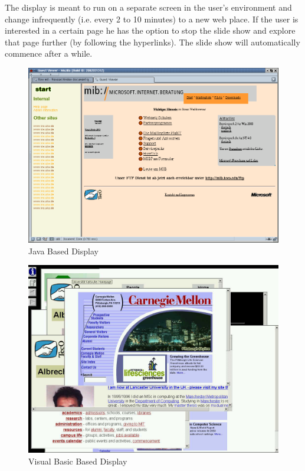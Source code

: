 \documentclass[a4paper,twoside]{danarticle}
\theoremstyle{remark}
\begin{document}
      The display is meant to run on a separate screen in the user's environment
      and change infrequently (i.e. every 2 to 10 minutes) to a new web place.
      If the user is interested in a certain page he has the option to stop the
      slide show and explore that page further (by following the hyperlinks). 
      The slide show will automatically commence after a while.
      \begin{figure}[ht]
       \centering
	 \includegraphics[width=12cm]{javaclient}
	 \caption{Java Based Display}
	 \label{javaclient}
       \end{figure}
      \begin{figure}[ht]
        \centering
        \includegraphics[width=12cm]{vbclient}
        \caption{Visual Basic Based Display}
        \label{vbclient}
      \end{figure}
      
\end{document}

